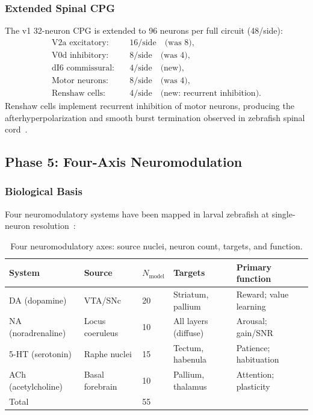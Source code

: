 \documentclass[11pt,a4paper]{article}
\begin{document}
\subsubsection{Extended Spinal CPG}

The v1 32-neuron CPG is extended to 96 neurons per full circuit (48/side):
\begin{equation}
\begin{aligned}
  \text{V2a excitatory}: &\quad 16/\text{side}\quad\text{(was 8)}, \\
  \text{V0d inhibitory}: &\quad  8/\text{side}\quad\text{(was 4)}, \\
  \text{dI6 commissural}: &\quad  4/\text{side}\quad\text{(new)}, \\
  \text{Motor neurons}:  &\quad  8/\text{side}\quad\text{(was 4)}, \\
  \text{Renshaw cells}:  &\quad  4/\text{side}\quad\text{(new: recurrent inhibition)}.
\end{aligned}
\end{equation}
Renshaw cells implement recurrent inhibition of motor neurons,
producing the afterhyperpolarization and smooth burst termination
observed in zebrafish spinal cord~\cite{bhatt2009}.

\subsection{Phase 5: Four-Axis Neuromodulation}\label{sec:phase5}

\subsubsection{Biological Basis}

Four neuromodulatory systems have been mapped in larval zebrafish
at single-neuron resolution~\cite{ahrens2013,jesuthasan2012}:

\begin{table}[H]
\centering
\caption{Four neuromodulatory axes: source nuclei, neuron count, targets, and function.}
\label{tab:neuromod}
\begin{tabular}{lllll}
\toprule
System & Source & $N_\mathrm{model}$ & Targets & Primary function \\
\midrule
DA (dopamine)       & VTA/SNc         & 20 & Striatum, pallium     & Reward; value learning \\
NA (noradrenaline)  & Locus coeruleus & 10 & All layers (diffuse)  & Arousal; gain/SNR \\
5-HT (serotonin)    & Raphe nuclei    & 15 & Tectum, habenula      & Patience; habituation \\
ACh (acetylcholine) & Basal forebrain & 10 & Pallium, thalamus     & Attention; plasticity \\
\midrule
Total & & 55 & & \\
\bottomrule
\end{tabular}
\end{table}
\end{document}
